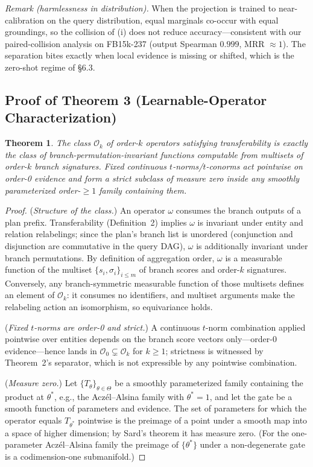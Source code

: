 \documentclass[journal]{IEEEtran}
\newtheorem{theorem*}{Theorem}
\begin{document}
\emph{Remark (harmlessness in distribution).} When the projection is
trained to near-calibration on the query distribution, equal marginals
co-occur with equal groundings, so the collision of (i) does not reduce
accuracy---consistent with our paired-collision analysis on FB15k-237
(output Spearman $0.999$, MRR $\approx 1$). The separation bites exactly
when local evidence is missing or shifted, which is the zero-shot regime
of \S6.3.

\subsection*{Proof of Theorem 3 (Learnable-Operator Characterization)}

\begin{theorem*}
The class $\mathcal O_k$ of order-$k$ operators satisfying transferability
is exactly the class of branch-permutation-invariant functions computable
from multisets of order-$k$ branch signatures. Fixed continuous
$t$-norms/$t$-conorms act pointwise on order-0 evidence and form a strict
subclass of measure zero inside any smoothly parameterized order-$\ge1$
family containing them.
\end{theorem*}
\begin{proof}
(\emph{Structure of the class.}) An operator $\omega$ consumes the branch
outputs of a plan prefix. Transferability (Definition~2) implies $\omega$
is invariant under entity and relation relabelings; since the plan's
branch list is unordered (conjunction and disjunction are commutative in
the query DAG), $\omega$ is additionally invariant under branch
permutations. By definition of aggregation order, $\omega$ is a measurable
function of the multiset $\{s_i,\sigma_i\}_{i\le m}$ of branch scores and
order-$k$ signatures. Conversely, any branch-symmetric measurable function
of those multisets defines an element of $\mathcal O_k$: it consumes no
identifiers, and multiset arguments make the relabeling action an
isomorphism, so equivariance holds.

(\emph{Fixed $t$-norms are order-0 and strict.}) A continuous $t$-norm
combination applied pointwise over entities depends on the branch score
vectors only---order-0 evidence---hence lands in
$\mathcal O_0\subsetneq\mathcal O_k$ for $k\ge1$; strictness is witnessed
by Theorem~2's separator, which is not expressible by any pointwise
combination.

(\emph{Measure zero.}) Let $\{T_\theta\}_{\theta\in\Theta}$ be a smoothly
parameterized family containing the product at $\theta^\ast$, e.g., the
Acz\'el--Alsina family with $\theta^\ast=1$, and let the gate be a smooth
function of parameters and evidence. The set of parameters for which the
operator equals $T_{\theta^\ast}$ pointwise is the preimage of a point
under a smooth map into a space of higher dimension; by Sard's theorem it
has measure zero. (For the one-parameter Acz\'el--Alsina family the
preimage of $\{\theta^\ast\}$ under a non-degenerate gate is a
codimension-one submanifold.)
\end{proof}
\end{document}
